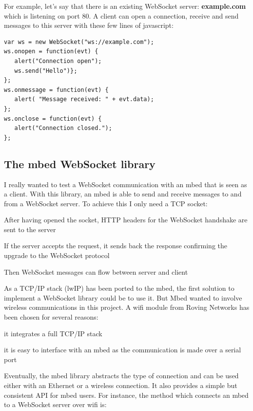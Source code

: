 \documentclass[pdftex,10pt,a4paper]{report}
\newenvironment{packed_item}{
\begin{itemize}
  \setlength{\itemsep}{1pt}
  \setlength{\parskip}{0pt}
  \setlength{\parsep}{0pt}
}{\end{itemize}}
\begin{document}
For example, let's say that there is an existing WebSocket server: \textbf{example.com} which is listening on port 80. A client can open a connection, receive and send messages to this server with these few lines of javascript:

\begin{center}
\begin{lstlisting}[label=Javascript Websocket Hello World,caption=Javascript Websocket Hello World]
var ws = new WebSocket("ws://example.com");
ws.onopen = function(evt) { 
   alert("Connection open"); 
   ws.send("Hello")}; 
};
ws.onmessage = function(evt) { 
   alert( "Message received: " + evt.data); 
}; 
ws.onclose = function(evt) { 
   alert("Connection closed."); 
};
\end{lstlisting}
\end{center}


\subsection{The mbed WebSocket library}
I really wanted to test a WebSocket communication with an mbed that is seen as a client. With this library, an mbed is able to send and receive messages to and from a WebSocket server. To achieve this I only need a TCP socket:
\begin{packed_item}
	\item After having opened the socket, HTTP headers for the WebSocket handshake are sent to the server
	\item If the server accepts the request, it sends back the response confirming the upgrade to the WebSocket protocol 
	\item Then WebSocket messages can flow between server and client
\end{packed_item}

As a TCP/IP stack (lwIP) has been ported to the mbed, the first solution to implement a WebSocket library could be to use it. But Mbed wanted to involve wireless communications in this project. A wifi module from Roving Networks has been chosen for several reasons:
\begin{packed_item}
	\item it integrates a full TCP/IP stack
	\item it is easy to interface with an mbed as the communication is made over a serial port
\end{packed_item}

Eventually, the mbed library abstracts the type of connection and can be used either with an Ethernet or a wireless connection. It also provides a simple but consistent API for mbed users. For instance, the method which connects an mbed to a WebSocket server over wifi is:
\end{document}
